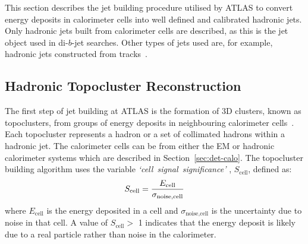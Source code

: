
This section describes the jet building procedure utilised by ATLAS
to convert energy deposits in calorimeter cells into well defined and calibrated hadronic jets.
Only hadronic jets built from calorimeter cells are described,
as this is the jet object used in di-$b$-jet searches.
Other types of jets used %
are, for example,
hadronic jets constructed from tracks~\cite{obj-Hbb_exotic}.

\newpage
\subsection{Hadronic Topocluster Reconstruction}
\label{sec:obj-jets_topo}

The first step of jet building at ATLAS is the formation of 3D clusters, known as topoclusters, from groups of energy deposits in neighbouring calorimeter cells~\cite{obj-jets_topo}.
Each topocluster represents a hadron or a set of collimated hadrons within a hadronic jet.
The calorimeter cells can be from either the EM or hadronic calorimeter systems which are described in Section~\ref{sec:det-calo}.
The topocluster building algorithm uses the variable \mbox{\textit{`cell signal significance'}}
, $S_{\text{cell}}$, defined as:
\begin{equation}
  \vspace{0.2em}
  {S_{\text{cell}} = \frac{E_{\text{cell}}}{\sigma_{\text{noise,cell}}}}
\end{equation}
where $E_{\text{cell}}$ is the energy deposited in a cell
and $\sigma_{\text{noise,cell}}$ is the uncertainty due to noise in that cell.
A value of $S_{\text{cell}} >$ 1 indicates that the energy deposit is likely due to a real particle rather than noise in the calorimeter.

